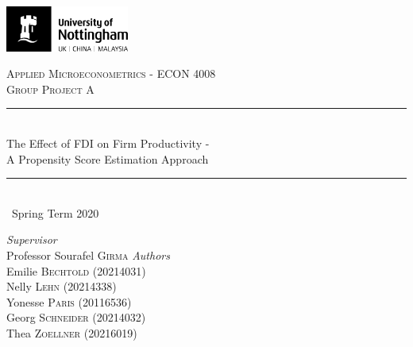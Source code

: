 \documentclass[a4paper,11pt]{scrartcl}
\newcommand{\sectionnumbering}[1]{%
  \setcounter{section}{0}%
   \renewcommand{\thesection}{\csname #1\endcsname{section}}}
\begin{document}
	\begin{titlepage}
		\newcommand{\HRule}{\rule{\linewidth}{0.5mm}}
		
	\vfill\vfill
	\includegraphics[height=1.5cm]{UoN_Logo}\\[1cm] 

	\vfill\vfill
	\center			
 
	\textsc{\Large Applied Microeconometrics - ECON 4008}\\[0.5cm] 	
	\textsc{\large Group Project A}\\[0.5cm] 
	
	\HRule\\[0.4cm]
	{\huge The Effect of FDI on Firm Productivity - \\[0.4cm] A Propensity Score Estimation Approach}\\[0.4cm] 
	\HRule\\[0.4cm]
	
	{\large\ Spring Term 2020} 	
	\vfill\vfill\vfill\vfill	
	
\begin{flushleft}
			\large
			\textit{Supervisor}\\
			Professor Sourafel \textsc{Girma} 
			\vfill\vfill 
			\textit{Authors}\\
			Emilie \textsc{Bechtold} (20214031)\\
			Nelly  \textsc{Lehn} (20214338)\\
			Yonesse \textsc{Paris} (20116536)\\
			Georg  \textsc{Schneider} (20214032)\\
			Thea  \textsc{Zoellner} (20216019)
		\end{flushleft}
	\vfill 
	
\end{titlepage}


\sectionnumbering{Roman}
\tableofcontents

\newpage

\listoftables
\listoffigures
\newpage

\sectionnumbering{arabic}
\end{document}
